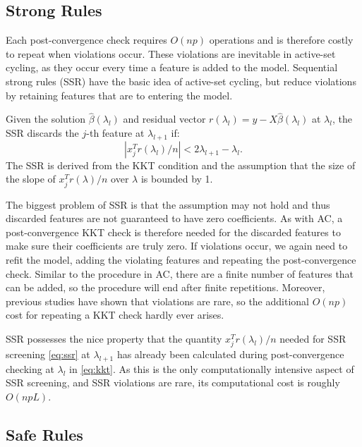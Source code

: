\subsection{Strong Rules}

Each post-convergence check requires $O(np)$ operations and is therefore costly to repeat when violations occur.  These violations are inevitable in active-set cycling, as they occur every time a feature is added to the model.  Sequential strong rules (SSR) \citep{Tibshirani2012} have the basic idea of active-set cycling, but reduce violations by retaining features that are  to entering the model.

Given the solution $\hat{\beta}(\lambda_l)$ and residual vector $r(\lambda_l)=y-X\hat{\beta}(\lambda_l)$ at $\lambda_l$, the SSR discards the $j$-th feature at $\lambda_{l+1}$ if:
\begin{equation}
  \label{eq:ssr}
  |x_j^Tr(\lambda_l)/n|<2\lambda_{l+1}-\lambda_l.
\end{equation}
The SSR is derived from the KKT condition and the  assumption that the size of the slope of $x_j^Tr(\lambda)/n$ over $\lambda$ is bounded by 1. 

The biggest problem of SSR is that the  assumption may not hold and thus discarded features are not guaranteed to have zero coefficients. As with AC, a post-convergence KKT check is therefore needed for the discarded features to make sure their coefficients are truly zero. If violations occur, we again need to refit the model, adding the violating features and repeating the post-convergence check. Similar to the procedure in AC, there are a finite number of features that can be added, so the procedure will end after finite repetitions. Moreover, previous studies have shown that violations are rare, so the additional $O(np)$ cost for repeating a KKT check hardly ever arises.

SSR possesses the nice property that the quantity $x_j^Tr(\lambda_l)/n$ needed for SSR screening \eqref{eq:ssr} at $\lambda_{l+1}$ has already been calculated during post-convergence checking at $\lambda_l$ in \eqref{eq:kkt}. As this is the only computationally intensive aspect of SSR screening, and SSR violations are rare, its computational cost is roughly $O(npL)$.

\subsection{Safe Rules}
\label{sec:safe}

